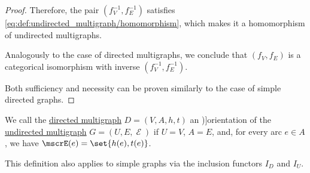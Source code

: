 \begin{proof}
  Therefore, the pair \( (f_V^{-1}, f_E^{-1}) \) satisfies \eqref{eq:def:undirected_multigraph/homomorphism}, which makes it a homomorphism of undirected multigraphs.

  Analogously to the case of directed multigraphs, we conclude that \( (f_V, f_E) \) is a categorical isomorphism with inverse \( (f_V^{-1}, f_E^{-1}) \).

   Both sufficiency and necessity can be proven similarly to the case of simple directed graphs.
\end{proof}

\begin{definition}\label{def:multigraph_orientation}
  We call the \hyperref[def:directed_multigraph]{directed multigraph} \( D = (V, A, h, t) \) an \term[ru=ориентация (\cite[32]{Емеличев1990})]{orientation} of the \hyperref[def:undirected_multigraph]{undirected multigraph} \( G = (U, E, \mscrE) \) if \( U = V \), \( A = E \), and, for every arc \( e \in A \), we have \( \mscrE(e) = \set{ h(e), t(e) } \).
\end{definition}
\begin{comments}
  \item This definition also applies to simple graphs via the inclusion functors \hyperref[def:graph_functors/directed_inclusion]{\( I_D \)} and \hyperref[def:graph_functors/undirected_inclusion]{\( I_U \)}.
\end{comments}


